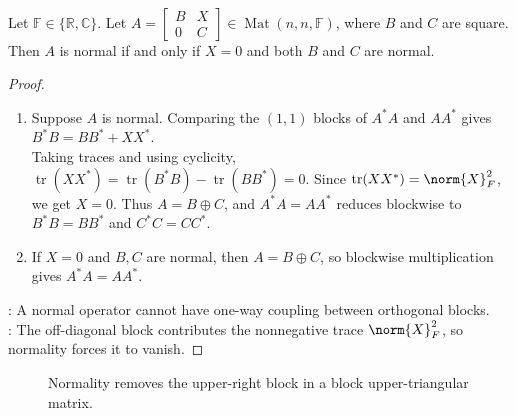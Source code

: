 \begin{proposition} \label{prop:block-upper-triangular-normal-collapse} \\
Let $\mathbb{F}\in\{\mathbb{R},\mathbb{C}\}$. Let $A=
\begin{bmatrix}
B&X\\
0&C
\end{bmatrix}
\in\operatorname{Mat}(n,n,\mathbb{F})$, where $B$ and $C$ are square.\\
Then $A$ is normal if and only if $X=0$ and both $B$ and $C$ are normal.
\begin{proof}
\begin{enumerate}[label=\roman*.]
\setlength{\itemsep}{0pt}
\item[$(\Rightarrow)$] Suppose $A$ is normal. Comparing the $(1,1)$ blocks of $A^*A$ and $AA^*$ gives $B^*B=BB^*+XX^*$.\\
Taking traces and using cyclicity, $\operatorname{tr}(XX^*)=\operatorname{tr}(B^*B)-\operatorname{tr}(BB^*)=0$. Since $\operatorname{tr}(XX^*)=\norm{X}_F^2$, we get $X=0$. Thus $A=B\oplus C$, and $A^*A=AA^*$ reduces blockwise to $B^*B=BB^*$ and $C^*C=CC^*$.
\item[$(\Leftarrow)$] If $X=0$ and $B,C$ are normal, then $A=B\oplus C$, so blockwise multiplication gives $A^*A=AA^*$.
\end{enumerate}
: A normal operator cannot have one-way coupling between orthogonal blocks.\\
: The off-diagonal block contributes the nonnegative trace $\norm{X}_F^2$, so normality forces it to vanish.
\end{proof}
\end{proposition}

\begin{figure}[H]
  \centering
  
  \caption{Normality removes the upper-right block in a block upper-triangular matrix.}
  \label{fig:block-upper-triangular-normal-collapse}
\end{figure}

